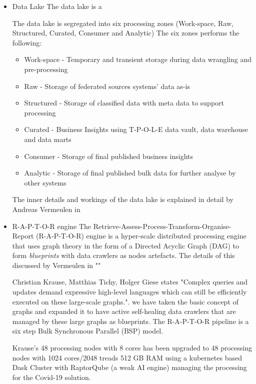 \begin{itemize}
    \item Data Lake
    The data lake is a 
    
    The data lake is segregated into six processing zones (Work-space, Raw, Structured, Curated, Consumer and Analytic) 
    The six zones performs the following:
    \begin{itemize}
        \item Work-space - Temporary and transient storage during data wrangling and pre-processing
        \item Raw - Storage of federated sources systems' data as-is
        \item Structured - Storage of classified data with meta data to support processing
        \item Curated - Business Insights using T-P-O-L-E data vault, data warehouse and data marts
        \item Consumer - Storage of final published business insights
        \item Analytic - Storage of final published bulk data for further analyse by other systems
    \end{itemize}
    
    The inner details and workings of the data lake is explained in detail by Andreas Vermeulen in 
    
    
    \item R-A-P-T-O-R engine
    The Retrieve-Assess-Process-Transform-Organise-Report (R-A-P-T-O-R) engine is a hyper-scale distributed processing engine that uses graph theory in the form of a Directed Acyclic Graph (DAG) to form \emph{blueprints} with data crawlers as nodes artefacts. The details of this discussed by Vermeulen in "" \cite{...}
    
    Christian Krause, Matthias Tichy, Holger Giese \cite{Krause2014} states "Complex queries and updates demand expressive high-level languages which can still be efficiently executed on these large-scale graphs.". we have taken the basic concept of graphs and expanded it to have active self-healing data crawlers that are managed by these large graphs as blueprints. The R-A-P-T-O-R pipeline is a six step Bulk Synchronous Parallel (BSP) model.
    
    Krause's 48 processing nodes with 8 cores has been upgraded to 48 processing nodes with 1024 cores/2048 treads 512 GB RAM using a kubernetes based Dask Cluster with RaptorQube (a weak AI engine) managing the processing for the Covid-19 solution. 
    
\end{itemize}

